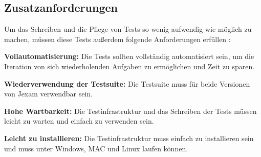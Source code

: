 \subsection{Zusatzanforderungen}

Um das Schreiben und die Pflege von Tests so wenig aufwendig wie m\"oglich
zu machen, m\"ussen diese Tests au{\ss}erdem folgende Anforderungen erf\"ullen :


\textbf{Vollautomatisierung:}  Die Tests sollten vollst\"andig automatisiert sein,
um die Iteration von sich wiederholenden Aufgaben zu erm\"oglichen
und Zeit zu sparen.

\textbf{Wiederverwendung der Testsuite:} Die Testsuite muss f\"ur beide Versionen 
von Jexam verwendbar sein.

\textbf{Hohe Wartbarkeit:} Die Testinfrastruktur und das Schreiben der Tests
m\"ussen leicht zu warten und einfach zu verwenden sein.

\textbf{Leicht zu installieren:} Die Testinfrastruktur muss einfach zu installieren sein und muss
unter Windows, MAC und Linux laufen k\"onnen.

